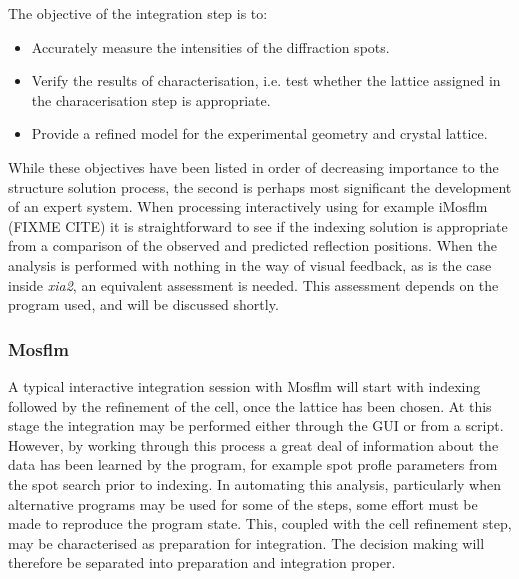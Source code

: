 \documentclass[a4paper,11pt]{article}
\begin{document}
The objective of the integration step is to:

\begin{itemize}
\item{Accurately measure the intensities of the diffraction spots.}
\item{Verify the results of characterisation, i.e. test whether the
    lattice assigned in the characerisation step is appropriate.}
\item{Provide a refined model for the experimental geometry and
    crystal lattice.}
\end{itemize}

\noindent
While these objectives have been listed in order of decreasing
importance to the structure solution process, the second is perhaps
most significant the development of an expert system. When processing
interactively using for example iMosflm (FIXME CITE) it is
straightforward to see if the indexing solution is appropriate from a
comparison of the observed and predicted reflection positions. When
the analysis is performed with nothing in the way of visual feedback,
as is the case inside \emph{xia2}, an equivalent assessment is
needed. This assessment depends on the program used, and will be
discussed shortly.

\subsubsection{Mosflm}

A typical interactive integration session with Mosflm will start with
indexing followed by the refinement of the cell, once the lattice has
been chosen. At this stage the integration may be performed either
through the GUI or from a script. However, by working through this
process a great deal of information about the data has been learned by
the program, for example spot profle parameters from the spot search
prior to indexing. In automating this analysis, particularly when
alternative programs may be used for some of the steps, some effort
must be made to reproduce the program state. This, coupled with the
cell refinement step, may be characterised as preparation for
integration. The decision making will therefore be separated into
preparation and integration proper.
\end{document}
